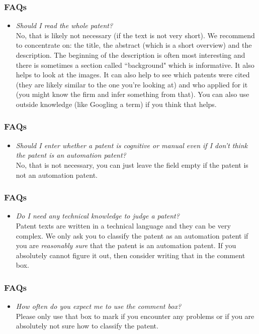 \documentclass[10pt]{beamer}
\begin{document}
\begin{frame}\frametitle{FAQs}
	\begin{itemize}	
	\item \textit{Should I read the whole patent?}\\[0.1cm]
	No, that is likely not necessary (if the text is not very short). We recommend to concentrate on: the title, the abstract (which is a short overview) and the description. The beginning of the description is often most interesting and there is sometimes a section called ``background" which is informative. It also helps to look at the images. It can also help to see which patents were cited (they are likely similar to the one you're looking at) and who applied for it (you might know the firm and infer something from that). You can also use outside knowledge (like Googling a term) if you think that helps. 
	\end{itemize}
\end{frame}	


\begin{frame}\frametitle{FAQs}
	\begin{itemize}	
	\item \textit{Should I enter whether a patent is cognitive or manual even if I don't think the patent is an automation patent?}\\[0.1cm]
	No, that is not necessary, you can just leave the field empty if the patent is not an automation patent.
	\end{itemize}
\end{frame}	


\begin{frame}\frametitle{FAQs}
	\begin{itemize}	
	\item \textit{Do I need any technical knowledge to judge a patent?}\\[0.1cm]
	Patent texts are written in a technical language and they can be very complex. We only ask you to classify the patent as an automation patent if you are \textit{reasonably sure} that the patent is an automation patent. If you absolutely cannot figure it out, then consider writing that in the comment box.
	\end{itemize}
\end{frame}

	
\begin{frame}\frametitle{FAQs}
	\begin{itemize}	
	\item \textit{How often do you expect me to use the comment box?}\\[0.1cm]
	Please only use that box to mark if you encounter any problems or if you are absolutely not sure how to classify the patent.
	\end{itemize}
\end{frame}	
\end{document}

